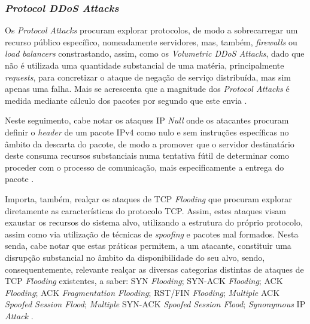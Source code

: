 \subsubsection{\textit{Protocol DDoS Attacks}}
Os \textit{Protocol Attacks} procuram explorar protocolos, de modo a sobrecarregar um recurso público específico, nomeadamente servidores, mas, também, \textit{firewalls} ou \textit{load balancers} constrastando, assim, como os \textit{Volumetric DDoS Attacks}, dado que não é utilizada uma quantidade substancial de uma matéria, principalmente \textit{requests}, para concretizar o ataque de negação de serviço distribuída, mas sim apenas uma falha. Mais se acrescenta que a magnitude dos \textit{Protocol Attacks} é medida mediante cálculo dos pacotes por segundo que este envia \cite{esecurityplanet_types_of_ddos_attacks}.


Neste seguimento, cabe notar os ataques IP \textit{Null} onde os atacantes procuram definir o \textit{header} de um pacote IPv4 como nulo e sem instruções específicas no âmbito da descarta do pacote, de modo a promover que o servidor destinatário deste consuma recursos substanciais numa tentativa fútil de determinar como proceder com o processo de comunicação, mais especificamente a entrega do pacote \cite{esecurityplanet_types_of_ddos_attacks}.

Importa, também, realçar os ataques de TCP \textit{Flooding} que procuram explorar diretamente as características do protocolo TCP. Assim, estes ataques visam exaustar os recursos do sistema alvo, utilizando a estrutura do próprio protocolo, assim como via utilização de técnicas de \textit{spoofing} e pacotes mal formados. Nesta senda, cabe notar que estas práticas permitem, a um atacante, constituir uma disrupção substancial no âmbito da disponibilidade do seu alvo, sendo, consequentemente, relevante realçar as diversas categorias distintas de ataques de TCP \textit{Flooding} existentes, a saber: SYN \textit{Flooding}; SYN-ACK \textit{Flooding}; ACK \textit{Flooding}; ACK \textit{Fragmentation Flooding}; RST/FIN \textit{Flooding}; \textit{Multiple} ACK \textit{Spoofed Session Flood}; \textit{Multiple} SYN-ACK \textit{Spoofed Session Flood}; \textit{Synonymous} IP \textit{Attack} \cite{esecurityplanet_types_of_ddos_attacks,connectwise_types_of_ddos_attacks}.


